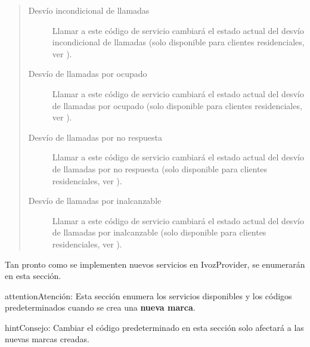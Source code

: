 \documentclass[letterpaper,10pt,spanish]{sphinxmanual}
\begin{document}
\begin{quote}
\begin{description}
\item[{Desvío incondicional de llamadas}] \leavevmode
Llamar a este código de servicio cambiará el estado actual del desvío incondicional de llamadas (solo disponible para clientes residenciales, ver {\hyperref[administration_portal/client/residential/residential_devices:residential\string-devices\string-cfw]{}}).

\item[{Desvío de llamadas por ocupado}] \leavevmode
Llamar a este código de servicio cambiará el estado actual del desvío de llamadas por ocupado (solo disponible para clientes residenciales, ver {\hyperref[administration_portal/client/residential/residential_devices:residential\string-devices\string-cfw]{}}).

\item[{Desvío de llamadas por no respuesta}] \leavevmode
Llamar a este código de servicio cambiará el estado actual del desvío de llamadas por no respuesta (solo disponible para clientes residenciales, ver {\hyperref[administration_portal/client/residential/residential_devices:residential\string-devices\string-cfw]{}}).

\item[{Desvío de llamadas por inalcanzable}] \leavevmode
Llamar a este código de servicio cambiará el estado actual del desvío de llamadas por inalcanzable (solo disponible para clientes residenciales, ver {\hyperref[administration_portal/client/residential/residential_devices:residential\string-devices\string-cfw]{}}).

\end{description}
\end{quote}

Tan pronto como se implementen nuevos servicios en IvozProvider, se enumerarán en esta sección.

\begin{notice}{attention}{Atención:}
Esta sección enumera los servicios disponibles y los códigos predeterminados cuando se crea una \textbf{nueva marca}.
\end{notice}

\begin{notice}{hint}{Consejo:}
Cambiar el código predeterminado en esta sección solo afectará a las nuevas marcas creadas.
\end{notice}
\end{document}
